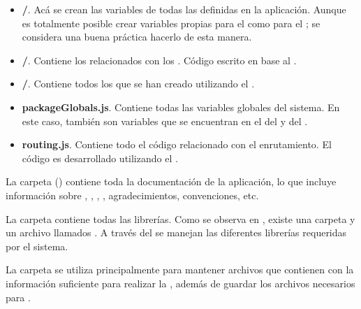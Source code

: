 

\begin{itemize}
	\item
		\textbf{\folderCollections/}. Acá se crean las variables de todas las \collectionsMETEOR definidas en la aplicación. Aunque es totalmente posible crear variables propias para el \clientAS como para el \serverAS; se considera una buena práctica hacerlo de esta manera.
	\item
	 	\textbf{\folderHooks/}. Contiene los \hooksCPT relacionados con los \collectionsMETEOR. Código escrito en base al \packagesAS \nameCollectionHooks.
	\item
		\textbf{\folderSchemas/}. Contiene todos los \schemasDB que se han creado utilizando el \packagesAS \nameCollectionTwo.
	\item
		\textbf{packageGlobals.js}. Contiene todas las variables globales del sistema. En este caso, también son variables que se encuentran en el \environmentPL del \clientAS y del \serverAS.
	\item
		\textbf{routing.js}. Contiene todo el código relacionado con el enrutamiento. El código es desarrollado utilizando el \packagesAS \nameRouter.
\end{itemize}



La carpeta \folderDocs () contiene toda la documentación de la aplicación, lo que incluye información sobre \deploymentCPT, \packagesAS, \routingAS, \templatesMETEOR, agradecimientos, convenciones, etc.



La carpeta \folderLib contiene todas las librerías. Como se observa en , existe una carpeta y un archivo \jsonNAME llamados \folderBower. A través del \packagesAS \nameBower se manejan las diferentes librerías requeridas por el sistema.



La carpeta \privateFolder se utiliza principalmente para mantener archivos \jsonNAME que contienen \collectionsMETEOR con la información suficiente para realizar la \localisationPC, además de guardar los archivos necesarios para \fixturesPC.

